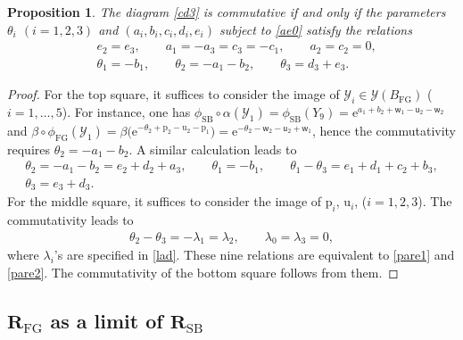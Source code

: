 \documentclass[pdftex]{sigma}
\newcommand{\e}{{\mathrm e}}
\newcommand{\uu}{{\mathsf u}}
\newcommand{\ww}{{\mathsf w}}
\numberwithin{equation}{section}
\newtheorem{Proposition}[Theorem]{Proposition}
 { \theoremstyle{definition}
\newtheorem{Example}[Theorem]{Example}
\newtheorem{Remark}[Theorem]{Remark} }
\begin{document}
\begin{Proposition}\label{pr:cd3}
 The diagram \eqref{cd3} is commutative if and only if the parameters
 $\theta_i$ $(i=1, 2, 3)$ and $(a_i,b_i, c_i, d_i, e_i)$ subject
 to \eqref{ae0} satisfy the relations
\begin{align}
&e_2 = e_3, \qquad a_1=-a_3=c_3=-c_1, \qquad a_2=c_2=0,
\label{pare1}
\\
&\theta_1 = -b_1, \qquad \theta_2 = -a_1-b_2, \qquad \theta_3= d_3+e_3.
\label{pare2}
\end{align}
\end{Proposition}
\begin{proof}
 For the top square, it suffices to consider the image of
 $\mathscr{Y}_i \in \mathcal{Y}(B_\mathrm{FG})$ ($i=1, \dots, 5$).
 For instance, one has
 $\phi_\mathrm{SB}\circ \alpha(\mathscr{Y}_1) =
 \phi_\mathrm{SB}(Y_9)= \e^{a_1+b_2+\ww_1-\uu_2-\ww_2}$ and
 $\beta \circ \phi_\mathrm{FG}(\mathscr{Y}_1) =
 \beta\bigl(\e^{-\theta_2+\mathrm{p}_2-\mathrm{u}_2-\mathrm{p}_1}\bigr) =
 \e^{-\theta_2-\ww_2-\uu_2+\ww_1}$, hence the commutativity requires
 $\theta_2 = -a_1-b_2$. A similar calculation leads to
\begin{gather*}
\theta_2 = -a_1-b_2 = e_2+d_2+a_3, \qquad \theta_1 = -b_1, \qquad
\theta_1-\theta_3 = e_1+d_1+c_2+b_3, \\ \theta_3 = e_3+d_3.
\end{gather*}
For the middle square, it suffices to consider the image of
$\mathrm{p}_i$, $\mathrm{u}_i$, ($i=1, 2, 3$). The commutativity
leads to
\begin{align*}
\theta_2-\theta_3 = -\lambda_1 = \lambda_2, \qquad
\lambda_0=\lambda_3=0,
\end{align*}
where $\lambda_i$'s are specified in \eqref{lad}.
These nine relations are equivalent to \eqref{pare1} and \eqref{pare2}.
The commutativity of the bottom square follows from them.
\end{proof}

\subsection[R\_FG as a limit of R\_SB]{$\boldsymbol{R_\mathrm{FG}}$ as a limit of $\boldsymbol{R_\mathrm{SB}}$}
\end{document}
